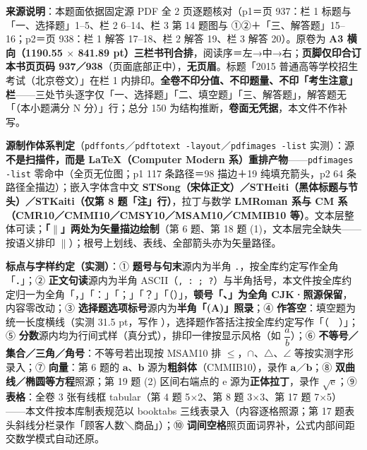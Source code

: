 


\begin{gktip}
\textbf{来源说明}：本题面依据固定源 PDF 全 2 页逐题核对（p1＝页 937：栏 1 标题与「一、选择题」1–5、栏 2 6–14、栏 3 第 14 题图与 ①②＋「三、解答题」15–16；p2＝页 938：栏 1 解答 17–18、栏 2 解答 19、栏 3 解答 20）。原卷为 \textbf{A3 横向（1190.55 \(\times\) 841.89 pt）三栏书刊合排}，阅读序＝左→中→右；\textbf{页脚仅印合订本书页页码 937／938}（页面底部正中），\textbf{无页眉}。标题「2015 普通高等学校招生考试（北京卷文）」在栏 1 内排印。\textbf{全卷不印分值、不印题量、不印「考生注意」栏}——三处节头逐字仅「一、选择题」「二、填空题」「三、解答题」，解答题无「（本小题满分 N 分）」行；总分 150 为结构推断，\textbf{卷面无凭据}，本文件不作补写。

\textbf{源制作体系判定}（\texttt{pdffonts}／\texttt{pdftotext -layout}／\texttt{pdfimages -list} 实测）：源\textbf{不是扫描件，而是 LaTeX（Computer Modern 系）重排产物}——\texttt{pdfimages -list} 零命中（全页无位图；p1 117 条路径＝98 描边＋19 纯填充箭头，p2 64 条路径全描边）；嵌入字体含中文 \textbf{STSong（宋体正文）／STHeiti（黑体标题与节头）／STKaiti（仅第 8 题「注」行）}，拉丁与数学 \textbf{LMRoman 系与 CM 系（CMR10／CMMI10／CMSY10／MSAM10／CMMIB10 等）}。文本层整体可读；\textbf{「$\parallel$」两处为矢量描边绘制}（第 6 题、第 18 题 (1)，文本层完全缺失——按语义排印 \(\parallel\)）；根号上划线、表线、全部箭头亦为矢量路径。

\textbf{标点与字样约定（实测）}：① \textbf{题号与句末}源内为半角 \texttt{.}，按全库约定写作全角「．」；② \textbf{正文句读}源内为半角 ASCII（\texttt{, : ; ?}）与半角括号，本文件按全库约定归一为全角「，」「：」「；」「？」「（）」，\textbf{顿号「、」为全角 CJK·照源保留}，内容零改动；③ \textbf{选择题选项标号}源内为\textbf{半角「(A)」照录}；④ \textbf{作答空}：填空题为统一长度横线（实测 31.5 pt，写作 \texttt{\gkblank{}}），选择题作答括注按全库约定写作「（　）」；⑤ \textbf{分数}源内均为行间式样（真分式），排印一律按显示风格（如 \(\dfrac{a}{b}\)）；⑥ \textbf{不等号／集合／三角／角号}：不等号若出现按 MSAM10 排 \(\leqslant\)，\(\cap\)、\(\triangle\)、\(\angle\) 等按实测字形录入；⑦ \textbf{向量}：第 6 题的 \(\boldsymbol{a}\)、\(\boldsymbol{b}\) 源为\textbf{粗斜体}（CMMIB10），录作 \(\boldsymbol{a}\)／\(\boldsymbol{b}\)；⑧ \textbf{双曲线／椭圆等方程}照源；第 19 题 (2) 区间右端点的 \(\mathrm{e}\) 源为\textbf{正体拉丁}，录作 \(\sqrt{\mathrm{e}}\)；⑨ \textbf{表格}：全卷 3 张有线框 tabular（第 4 题 5\(\times\)2、第 8 题 3\(\times\)3、第 17 题 7\(\times\)5）——本文件按本库制表规范以 booktabs 三线表录入（内容逐格照源；第 17 题表头斜线分栏录作「顾客人数＼商品」）；⑩ \textbf{词间空格}照页面词界补，公式内部间距交数学模式自动还原。


\end{gktip}
